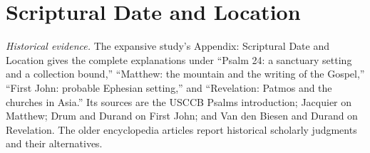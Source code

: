\newpage
\section{Scriptural Date and Location}


\smallskip
\noindent\textit{Historical evidence.} The expansive study's Appendix: Scriptural Date and Location gives the complete explanations under ``Psalm 24: a sanctuary setting and a collection bound,'' ``Matthew: the mountain and the writing of the Gospel,'' ``First John: probable Ephesian setting,'' and ``Revelation: Patmos and the churches in Asia.'' Its sources are the USCCB Psalms introduction; Jacquier on Matthew; Drum and Durand on First John; and Van den Biesen and Durand on Revelation. The older encyclopedia articles report historical scholarly judgments and their alternatives.
